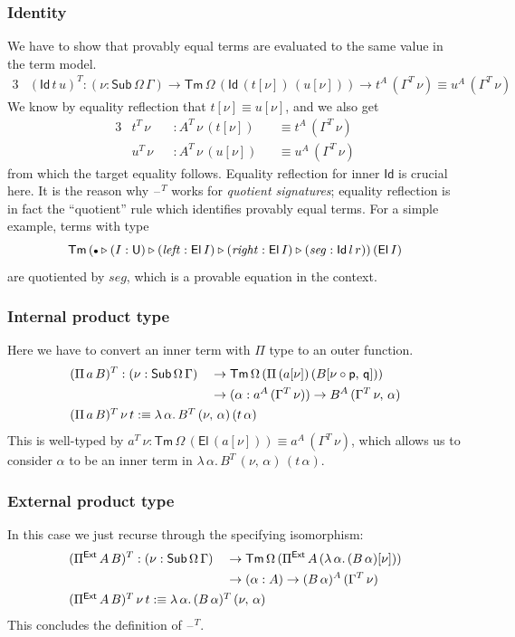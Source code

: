 \documentclass[12pt,a4paper,twoside,openany]{book}
\theoremstyle{remark}
\theoremstyle{definition}
\theoremstyle{theorem}
\newcommand{\mi}[1]{\mathit{#1}}
\newcommand{\Sub}{\mathsf{Sub}}
\newcommand{\Tm}{\mathsf{Tm}}
\newcommand{\U}{\mathsf{U}}
\newcommand{\El}{\mathsf{El}}
\newcommand{\Id}{\mathsf{Id}}
\newcommand{\blank}{\mathord{\hspace{1pt}\text{--}\hspace{1pt}}}
\newcommand{\ext}{\triangleright}
\newcommand{\emptycon}{\scaleobj{.75}\bullet}
\newcommand{\Pie}{\Pi^{\mathsf{Ext}}}
\newcommand{\p}{\mathsf{p}}
\newcommand{\q}{\mathsf{q}}
\newcommand{\defn}{:\equiv}
\begin{document}
\subsubsection{Identity}
We have to show that provably equal terms are evaluated to the same value in the
term model.
\begin{alignat*}{3}
  &(\Id\,t\,u)^T : (\nu : \Sub\,\Omega\,\Gamma)
    \to \Tm\,\Omega\,(\Id\,(t[\nu])\,(u[\nu])) \to t^A\,(\Gamma^T\,\nu) \equiv u^A\,(\Gamma^T\,\nu)
\end{alignat*}
We know by equality reflection that $t[\nu] \equiv u[\nu]$, and
we also get
\begin{alignat*}{3}
  &t^T\,\nu &&: A^T\,\nu\,(t[\nu]) &&\equiv t^A\,(\Gamma^T\,\nu)\\
  &u^T\,\nu &&: A^T\,\nu\,(u[\nu]) &&\equiv u^A\,(\Gamma^T\,\nu)
\end{alignat*}
from which the target equality follows. Equality reflection for inner $\Id$ is
crucial here. It is the reason why $\blank^T$ works for \emph{quotient
signatures}; equality reflection is in fact the ``quotient'' rule which
identifies provably equal terms. For a simple example, terms with type
\[
  \Tm\,
  (\emptycon \ext (I : \U) \ext (\mi{left} : \El\,I) \ext (\mi{right} : \El\,I) \ext (\mi{seg} : \Id\,l\,r))\,
  (\El\,I)
\]
are quotiented by $\mi{seg}$, which is a provable equation in the context.

\subsubsection{Internal product type}
Here we have to convert an inner term with $\Pi$ type to an outer function.
\begin{alignat*}{3}
  &(\Pi\,a\,B)^T : (\nu : \Sub\,\Omega\,\Gamma)
                 &&\to \Tm\,\Omega\,(\Pi\,(a[\nu])\,(B[\nu\circ\p,\,\q]))\\
  &              &&\to (\alpha : a^A\,(\Gamma^T\,\nu)) \to B^A\,(\Gamma^T\,\nu,\,\alpha)\\
  &\rlap{$(\Pi\,a\,B)^T\,\nu\,t \defn \lambda\,\alpha.\,B^T\,(\nu,\,\alpha)\,(t\,\alpha)$}
\end{alignat*}
This is well-typed by $a^T\,\nu :
\Tm\,\Omega\,(\El\,(a[\nu])) \equiv
a^A\,(\Gamma^T\,\nu)$, which allows us to consider $\alpha$ to be an inner term
in $\lambda\,\alpha.\,B^T\,(\nu,\,\alpha)\,(t\,\alpha)$.

\subsubsection{External product type}
In this case we just recurse through the specifying isomorphism:
\begin{alignat*}{3}
  &(\Pie\,A\,B)^T : (\nu : \Sub\,\Omega\,\Gamma)
                 &&\to \Tm\,\Omega\,(\Pie\,A\,(\lambda\,\alpha.\,(B\,\alpha)[\nu]))\\
  &              &&\to (\alpha : A) \to (B\,\alpha)^A\,(\Gamma^T\,\nu)\\
  &\rlap{$(\Pie\,A\,B)^T\,\nu\,t \defn \lambda\,\alpha.\,(B\,\alpha)^T\,(\nu,\,\alpha)$}
\end{alignat*}
This concludes the definition of $\blank^T$.
\end{document}
